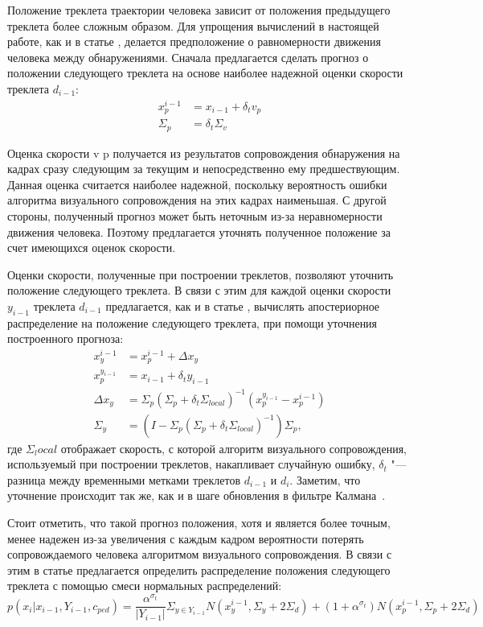 Положение треклета траектории человека зависит от положения предыдущего треклета более сложным образом. Для упрощения вычислений в настоящей работе, как и в статье \cite{benfold2011stable}, делается предположение о равномерности движения человека между
обнаружениями. Сначала предлагается сделать прогноз о положении следующего треклета на основе наиболее надежной оценки скорости треклета $d_{i-1}$:
\begin{equation}
	\begin{aligned}
		x_p^{i-1} &= x_{i-1} + \delta_t v_p \\
		\Sigma_p &= \delta_t\Sigma_v
	\end{aligned}
\end{equation}

Оценка скорости v p получается из результатов сопровождения обнаружения на кадрах сразу следующим за текущим и непосредственно ему предшествующим. Данная оценка считается наиболее надежной, поскольку вероятность ошибки алгоритма визуального сопровождения на этих кадрах наименьшая. С другой стороны, полученный прогноз может быть неточным из-за неравномерности движения человека. Поэтому предлагается уточнять полученное положение за счет имеющихся оценок скорости.

Оценки скорости, полученные при построении треклетов, позволяют уточнить положение следующего треклета. В связи с этим для каждой оценки скорости $y_{i-1}$ треклета $d_{i-1}$ предлагается, как и в статье \cite{benfold2011stable}, вычислять апостериорное распределение на положение следующего треклета, при помощи уточнения построенного прогноза:
\begin{align}
	x_y^{i-1}&=x_p^{i-1} + \Delta x_y \\
	x_p^{y_{i-1}}&= x_{i-1} + \delta_t y_{i-1} \\
	\Delta x_y &= \Sigma_p (\Sigma_p + \delta_t \Sigma_{local})^{-1}(x_p^{y_{i-1}} - x_p^{i-1}) \\
	\Sigma_y &= (I - \Sigma_p(\Sigma_p + \delta_t \Sigma_{local})^{-1})\Sigma_p,
\end{align}
где $\Sigma_local$ отображает скорость, с которой алгоритм визуального сопровождения, используемый при построении треклетов, накапливает случайную ошибку, $\delta_t$ "--- разница между временными метками треклетов $d_{i-1}$ и $d_i$. Заметим, что уточнение происходит так же, как и в шаге обновления в фильтре Калмана~\cite{kalman1960new}.

Стоит отметить, что такой прогноз положения, хотя и является более точным, менее надежен из-за увеличения с каждым кадром вероятности потерять сопровождаемого человека алгоритмом визуального сопровождения. В связи с этим в статье \cite{benfold2011stable} предлагается определить распределение положения следующего треклета с помощью смеси нормальных распределений:
\begin{equation}
p(x_i|x_{i-1}, Y_{i-1}, c_{ped}) = \frac{\alpha^{\sigma_t}}{\left|Y_{i-1}\right|}\Sigma_{y\in Y_{i-1}}N(x_y^{i-1}, \Sigma_y + 2\Sigma_d) + (1+\alpha^{\sigma_t})N(x_p^{i-1}, \Sigma_p + 2\Sigma_d)
\end{equation}

